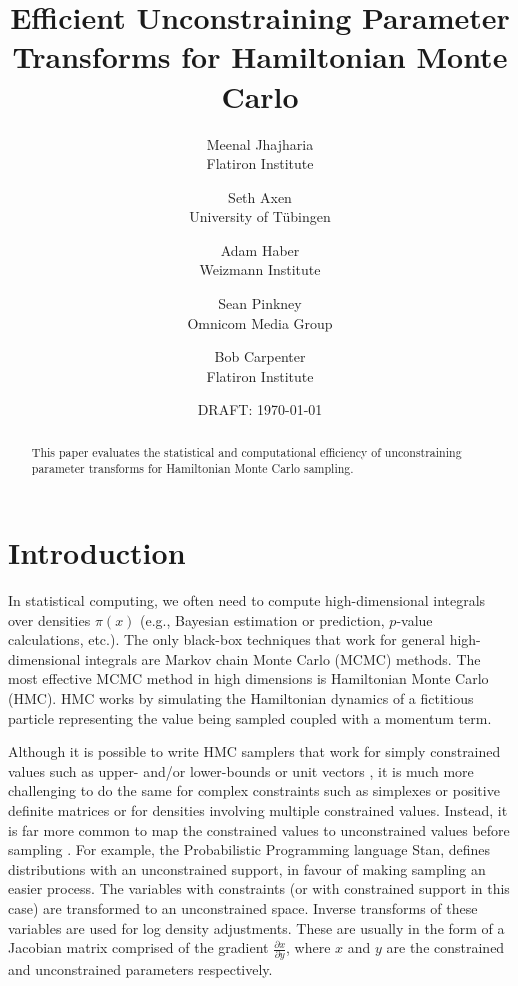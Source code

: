 \documentclass[11pt]{article}
\begin{document}
\title{Efficient Unconstraining
  Parameter Transforms for Hamiltonian Monte Carlo}
\author{Meenal Jhajharia \\ \small Flatiron Institute 
\and Seth Axen \\ \small University of T\"ubingen 
\and Adam Haber \\ \small Weizmann Institute 
\and Sean Pinkney \\ \small Omnicom Media Group
\and Bob Carpenter \\ \small Flatiron Institute}
\date{DRAFT: \today}
\maketitle

\begin{abstract}
  \noindent
  This paper evaluates the statistical and computational
  efficiency of unconstraining parameter transforms for Hamiltonian
  Monte Carlo sampling.
\end{abstract}

\section{Introduction}

In statistical computing, we often need to compute high-dimensional
integrals over densities $\pi(x)$ (e.g., Bayesian estimation or
prediction, $p$-value calculations, etc.).  The only black-box
techniques that work for general high-dimensional integrals are
Markov chain Monte Carlo (MCMC) methods.  The most effective MCMC
method in high dimensions is Hamiltonian Monte Carlo (HMC).  HMC works
by simulating the Hamiltonian dynamics of a fictitious particle
representing the value being sampled coupled with a momentum term.

Although it is possible to write HMC samplers that work for simply
constrained values such as upper- and/or lower-bounds
\cite{neal2011mcmc} or unit vectors \cite{byrne2013geodesic}, it is
much more challenging to do the same for complex constraints such as
simplexes or positive definite matrices or for densities involving
multiple constrained values.  Instead, it is far more common to map
the constrained values to unconstrained values before sampling
\cite{JSSv076i01}.  For example, the Probabilistic  Programming language Stan, defines distributions with an unconstrained support, in favour of making sampling an easier process. The variables with constraints (or with constrained support in this case) are transformed to an unconstrained space. Inverse transforms of these variables are used for log density adjustments. These are usually in the form of a Jacobian matrix comprised of the gradient $\frac{\partial x}{\partial y}$, where $x$ and $y$ are the constrained and unconstrained parameters respectively.
\end{document}
